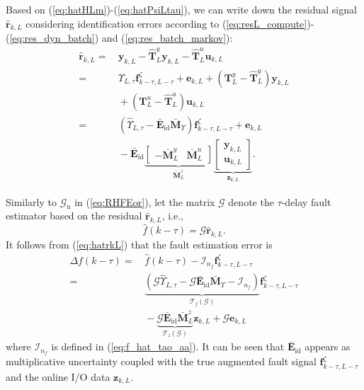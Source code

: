 \documentclass[twocolumn]{autart}
\begin{document}
Based on (\ref{eq:hatHLm})-(\ref{eq:hatPsiLtau}), we can write down the residual signal $\mathbf{\hat r}_{k,L}$ considering identification errors according to (\ref{eq:resL_compute})-(\ref{eq:res_dyn_batch}) and (\ref{eq:res_batch_markov}):
\begin{equation}\label{eq:hatrkL}
\begin{aligned}
\mathbf{\hat r}_{k,L} =&\, \mathbf{y}_{k,L} - \mathbf{\hat T}_L^y \mathbf{y}_{k,L} - \mathbf{\hat T}_L^u \mathbf{u}_{k,L} \\
=&\, {\Upsilon}_{L,\tau} \mathbf{f}_{k-\tau,L-\tau}^\zeta + \mathbf{e}_{k,L} + \left( \mathbf{T}_L^y - \mathbf{\hat T}_L^y \right)\mathbf{y}_{k,L} \\
 &\, + \left( \mathbf{T}_L^u - \mathbf{\hat T}_L^u \right)\mathbf{u}_{k,L} \\
=&\, \left( \hat {\Upsilon}_{L,\tau} - \mathbf{\bar E}_{\mathrm{id}} \mathbf{\bar M}_{\Upsilon} \right) \mathbf{f}_{k-\tau,L-\tau}^\zeta
+ \mathbf{e}_{k,L} \\
&\, - \mathbf{\bar E}_{\mathrm{id}}
\underbrace {\left[ \begin{array}{cc}
                      -\mathbf{\bar M}_L^y & \mathbf{\bar M}_L^u
                    \end{array}
 \right]}_{\mathbf{\bar M}_L^z}
\underbrace {\left[ \begin{array}{c}
                      \mathbf{y}_{k,L} \\
                      \mathbf{u}_{k,L}
                    \end{array}
 \right]}_{\mathbf{z}_{k,L}}.
\end{aligned}
\end{equation}

Similarly to $\mathcal{G}_\text{n}$ in (\ref{eq:RHFEor}), let the matrix $\mathcal{G}$ denote the $\tau$-delay fault estimator based on the residual $\mathbf{\hat r}_{k,L}$, i.e.,
\begin{equation}\label{eq:G_rkL}
\hat f(k-\tau) = \mathcal{G} \mathbf{\hat r}_{k,L}.
\end{equation}
It follows from (\ref{eq:hatrkL}) that the fault estimation error is 
\begin{equation}\label{eq:fest_err}
\begin{aligned}
\Delta f(k-\tau) =&\, \hat f(k-\tau) - \mathcal{I}_{n_f} \mathbf{f}_{k-\tau,L-\tau}^\zeta \\
=&\, \underbrace {\left( \mathcal{G} \hat {\Upsilon}_{L,\tau} - \mathcal{G} \mathbf{\bar E}_{\mathrm{id}} \mathbf{\bar M}_{\Upsilon} - \mathcal{I}_{n_f} \right)}_{\mathcal{T}_{f} \left( \mathcal{G} \right)} \mathbf{f}_{k-\tau,L-\tau}^\zeta \\
&\, - \underbrace {\mathcal{G} \mathbf{\bar E}_{\mathrm{id}} {\mathbf{\bar M}_L^z}}_{\mathcal{T}_{z} \left( \mathcal{G} \right)} \mathbf{z}_{k,L} + \mathcal{G} \mathbf{e}_{k,L}
\end{aligned}
\end{equation}
where $\mathcal{I}_{n_f}$ is defined in (\ref{eq:f_hat_tao_aa}). It can be seen that $\mathbf{\bar E}_{\mathrm{id}}$ appears as multiplicative uncertainty coupled with the true augmented fault signal $\mathbf{f}_{k-\tau,L-\tau}^\zeta$ and the online I/O data $\mathbf{z}_{k,L}$.
\end{document}
